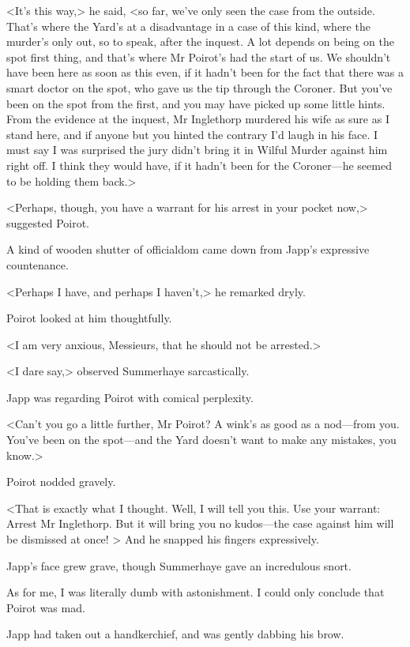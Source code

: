  <It's this way,> he said, <so far, we've only seen the case from the outside. That's where the Yard's at a disadvantage in a case of this kind, where the murder's only out, so to speak, after the inquest. A lot depends on being on the spot first thing, and that's where Mr Poirot's had the start of us. We shouldn't have been here as soon as this even, if it hadn't been for the fact that there was a smart doctor on the spot, who gave us the tip through the Coroner. But you've been on the spot from the first, and you may have picked up some little hints. From the evidence at the inquest, Mr Inglethorp murdered his wife as sure as I stand here, and if anyone but you hinted the contrary I'd laugh in his face. I must say I was surprised the jury didn't bring it in Wilful Murder against him right off. I think they would have, if it hadn't been for the Coroner—he seemed to be holding them back.> 

 <Perhaps, though, you have a warrant for his arrest in your pocket now,> suggested Poirot. 

 A kind of wooden shutter of officialdom came down from Japp's expressive countenance. 

 <Perhaps I have, and perhaps I haven't,> he remarked dryly. 

 Poirot looked at him thoughtfully. 

 <I am very anxious, Messieurs, that he should not be arrested.> 

 <I dare say,> observed Summerhaye sarcastically. 

 Japp was regarding Poirot with comical perplexity. 

 <Can't you go a little further, Mr Poirot? A wink's as good as a nod—from you. You've been on the spot—and the Yard doesn't want to make any mistakes, you know.> 

 Poirot nodded gravely. 

 <That is exactly what I thought. Well, I will tell you this. Use your warrant: Arrest Mr Inglethorp. But it will bring you no kudos—the case against him will be dismissed at once! > And he snapped his fingers expressively. 

 Japp's face grew grave, though Summerhaye gave an incredulous snort. 

 As for me, I was literally dumb with astonishment. I could only conclude that Poirot was mad. 

 Japp had taken out a handkerchief, and was gently dabbing his brow. 

